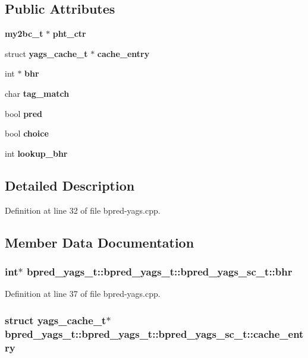 \subsection*{Public Attributes}
\begin{CompactItemize}
\item 
{\bf my2bc\_\-t} $\ast$ {\bf pht\_\-ctr}
\item 
struct {\bf yags\_\-cache\_\-t} $\ast$ {\bf cache\_\-entry}
\item 
int $\ast$ {\bf bhr}
\item 
char {\bf tag\_\-match}
\item 
bool {\bf pred}
\item 
bool {\bf choice}
\item 
int {\bf lookup\_\-bhr}
\end{CompactItemize}


\subsection{Detailed Description}


Definition at line 32 of file bpred-yags.cpp.

\subsection{Member Data Documentation}
\subsubsection[{bhr}]{\setlength{\rightskip}{0pt plus 5cm}int$\ast$ bpred\_\-yags\_\-t::bpred\_\-yags\_\-t::bpred\_\-yags\_\-sc\_\-t::bhr}\label{classbpred__yags__t_1_1bpred__yags__sc__t_aeddb31d90e4cfdc90bec6cf771a97e2}




Definition at line 37 of file bpred-yags.cpp.
\subsubsection[{cache\_\-entry}]{\setlength{\rightskip}{0pt plus 5cm}struct {\bf yags\_\-cache\_\-t}$\ast$ bpred\_\-yags\_\-t::bpred\_\-yags\_\-t::bpred\_\-yags\_\-sc\_\-t::cache\_\-entry\hspace{0.3cm}{\tt  [read]}}\label{classbpred__yags__t_1_1bpred__yags__sc__t_a432eec438ca435890327f84612941a4}




